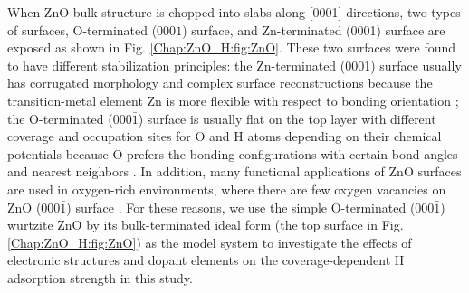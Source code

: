 When ZnO bulk structure is chopped into slabs along [0001] directions, two types of surfaces, O-terminated (000$\overline{1}$) surface, and Zn-terminated  (0001) surface are exposed as shown in Fig. \ref{Chap:ZnO_H:fig:ZnO}. These two surfaces were found to have different stabilization principles\cite{lauritsen2011stabilization}: the Zn-terminated  (0001) surface usually has corrugated morphology and complex surface reconstructions because the transition-metal element Zn is more flexible with respect to bonding orientation \cite{dulub2003novel,woll2007chemistry}; the O-terminated (000$\bar{1}$) surface is usually flat on the top layer with different coverage and occupation sites for O and H atoms depending on their chemical potentials because O prefers the bonding configurations with certain bond angles and nearest neighbors \cite{meyer2004first,lauritsen2011stabilization}. In addition, many functional applications of ZnO surfaces are used in oxygen-rich environments, where there are few oxygen vacancies on ZnO (000$\bar{1}$) surface \cite{meyer2004first,lauritsen2011stabilization,wahl2013stabilization}. For these reasons, we use the simple O-terminated (000$\bar{1}$) wurtzite ZnO by its bulk-terminated ideal form (the top surface in Fig. \ref{Chap:ZnO_H:fig:ZnO}) as the model system to investigate the effects of electronic structures and dopant elements on the coverage-dependent H adsorption strength in this study.